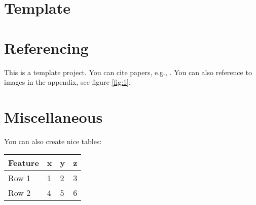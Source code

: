\section{Template}
\section*{Referencing}
This is a template project. You can cite papers, e.g., \cite{test-ref}. You can also reference to images in the appendix, see figure \ref{fig:1}.

\section*{Miscellaneous}
You can also create nice tables:

\begin{center}
    \begin{tabular}{ | l | p{1cm} | p{1cm} | p{1cm} |}
    \hline \textbf{Feature} & \textbf{x} & \textbf{y} & \textbf{z} \\
    \hline Row 1 & 1 & 2 & 3 \\
    \hline Row 2 & 4 & 5 & 6 \\
    \hline
    \end{tabular}
\end{center}